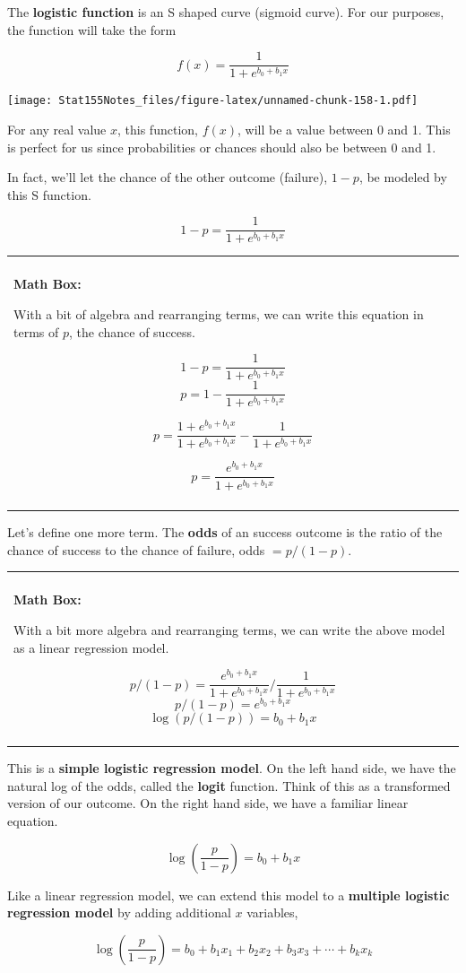 \documentclass[]{book}
\newenvironment{mathbox}
{
    \begin{center}
    
    \begin{tabular}{|p{0.8\textwidth}|}
    \rowcolor{LightYellow}
    \hline\\
    \rowcolor{LightYellow}
    \textbf{Math Box:}
}
{
    \\\rowcolor{LightYellow}
    \\\hline
    \end{tabular} 
    \end{center}
}
\begin{document}
The \textbf{logistic function} is an S shaped curve (sigmoid curve). For our purposes, the function will take the form

\[f(x) = \frac{1}{1 + e^{b_0 +b_1x}}\]

\texttt{[image: Stat155Notes\_files/figure-latex/unnamed-chunk-158-1.pdf]}

For any real value \(x\), this function, \(f(x)\), will be a value between 0 and 1. This is perfect for us since probabilities or chances should also be between 0 and 1.

In fact, we'll let the chance of the other outcome (failure), \(1-p\), be modeled by this S function.

\[1-p = \frac{1}{1 + e^{b_0 +b_1x}}\]

\begin{mathbox}
With a bit of algebra and rearranging terms, we can write this equation
in terms of \(p\), the chance of success.

\[1-p = \frac{1}{1 + e^{b_0 +b_1x}}\]
\[p = 1-\frac{1}{1 + e^{b_0 +b_1x}}\]

\[p = 
\frac{1 + e^{b_0 +b_1x}}{1 + e^{b_0 +b_1x}}-\frac{1}{1 + e^{b_0 +b_1x}}\]

\[p = \frac{e^{b_0 +b_1x}}{1 + e^{b_0 +b_1x}}\]
\end{mathbox}

Let's define one more term. The \textbf{odds} of an success outcome is the ratio of the chance of success to the chance of failure, odds \(=p/(1-p)\).

\begin{mathbox}
With a bit more algebra and rearranging terms, we can write the above
model as a linear regression model.

\[p/(1-p) = \frac{e^{b_0 +b_1x}}{1 + e^{b_0 +b_1x}}/\frac{1}{1 + e^{b_0 +b_1x}}\]
\[p/(1-p) = e^{b_0 +b_1x}\] \[\log(p/(1-p)) = b_0 +b_1x\]
\end{mathbox}

This is a \textbf{simple logistic regression model}. On the left hand side, we have the natural log of the odds, called the \textbf{logit} function. Think of this as a transformed version of our outcome. On the right hand side, we have a familiar linear equation.

\[\log\left(\frac{p}{1-p}\right) = b_0 +b_1x\]

Like a linear regression model, we can extend this model to a \textbf{multiple logistic regression model} by adding additional \(x\) variables,

\[\log\left(\frac{p}{1-p}\right) = b_0 +b_1x_1+b_2x_2+b_3x_3+\cdots +b_kx_k\]
\end{document}
